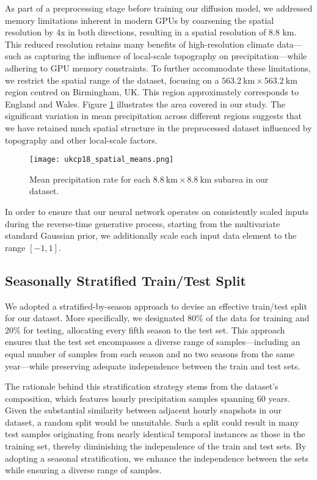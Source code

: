 \documentclass[ oneside,%
                    author={George Herbert},
                    degree={MSci},
                     title={Diffusion Models for Time-Evolving Precipitation Fields},
                  subtitle={}]{dissertation}
\begin{document}
As part of a preprocessing stage before training our diffusion model, we addressed memory limitations inherent in modern GPUs by coarsening the spatial resolution by 4x in both directions, resulting in a spatial resolution of 8.8 km. This reduced resolution retains many benefits of high-resolution climate data---such as capturing the influence of local-scale topography on precipitation---while adhering to GPU memory constraints. To further accommodate these limitations, we restrict the spatial range of the dataset, focusing on a $563.2\ \mathrm{km}\times 563.2\ \mathrm{km}$ region centred on Birmingham, UK. This region approximately corresponds to England and Wales. Figure \ref{fig:ukcp18_spatial_means} illustrates the area covered in our study. The significant variation in mean precipitation across different regions suggests that we have retained much spatial structure in the preprocessed dataset influenced by topography and other local-scale factors.

\begin{figure}[htbp]
      \centering
      \texttt{[image: ukcp18\_spatial\_means.png]}
      \caption{Mean precipitation rate for each $8.8\ \mathrm{km}\times 8.8\ \mathrm{km}$ subarea in our dataset.}
      \label{fig:ukcp18_spatial_means}
\end{figure}

In order to ensure that our neural network operates on consistently scaled inputs during the reverse-time generative process, starting from the multivariate standard Gaussian prior, we additionally scale each input data element to the range $[-1,1]$.

\subsection{Seasonally Stratified Train/Test Split}
\label{sec:results_dataset_train_test}

We adopted a stratified-by-season approach to devise an effective train/test split for our dataset. More specifically, we designated 80\% of the data for training and 20\% for testing, allocating every fifth season to the test set. This approach ensures that the test set encompasses a diverse range of samples---including an equal number of samples from each season and no two seasons from the same year---while preserving adequate independence between the train and test sets.

The rationale behind this stratification strategy stems from the dataset's composition, which features hourly precipitation samples spanning 60 years. Given the substantial similarity between adjacent hourly snapshots in our dataset, a random split would be unsuitable. Such a split could result in many test samples originating from nearly identical temporal instances as those in the training set, thereby diminishing the independence of the train and test sets. By adopting a seasonal stratification, we enhance the independence between the sets while ensuring a diverse range of samples.
\end{document}
